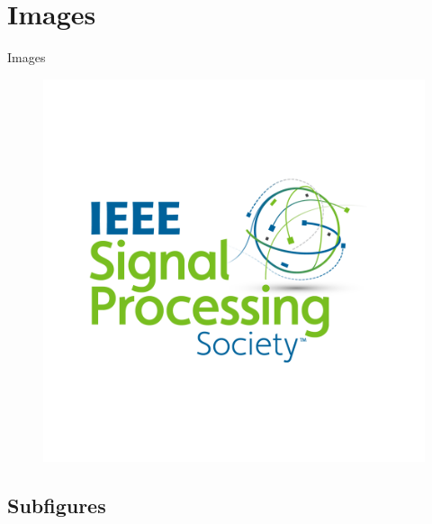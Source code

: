 \documentclass[aspectratio=169]{beamer}
\begin{document}
\section{Images}

\begin{frame}{Images}

\begin{figure}
    \centering
    \includegraphics[width=0.5\linewidth]{Figures/sps_logo.png}
\end{figure}

\end{frame}

\subsection{Subfigures}
\end{document}
